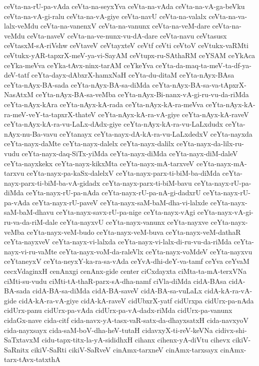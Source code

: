{ceVta-na-rU-pa-vAda
ceVta-na-seyxYva
ceVta-na-vAda
ceVta-na-vA-ga-beVku
ceVta-na-vA-gi-ralu
ceVta-na-vA-giye
ceVta-navU
ceVta-na-valalx
ceVta-na-va-lalx-veMdu
ceVta-na-vanenxV
ceVta-na-vanunx
ceVta-na-veM-dare
ceVta-na-veMdu
ceVta-naveV
ceVta-na-ve-nunx-vu-dA-dare
ceVta-navu
ceVtasusx
ceVtasxM-sA-riVshw
ceVtaveV
ceVtayxteV
ceVtf
ceVti
ceVtoV
ceVtukx-vaRMti
ceVtukx-yAR-tapxrX-meV-ya-vi-SayAM
ceVtupx-ru-SAthaRM
ceYSAM
ceYkAca
ceYka-meVva
ceYka-tAvx-ninx-tarAM
ceYkeYva
ceYta-da-maq-ta-meV-ta-df-ya-deV-tatf
ceYta-dayx-dAbxrX-hamxNaH
ceYta-du-ditaM
ceYta-nAyx-BAsa
ceYta-nAyx-BA-sada
ceYta-nAyx-BA-sa-diMda
ceYta-nAyx-BA-sa-va-tApxrX-NasAtxM
ceYta-nAyx-BA-sa-veMba
ceYta-nAyx-Bi-nanx-vA-gi-ru-vu-da-riMda
ceYta-nAyx-kAra
ceYta-nAyx-kA-rada
ceYta-nAyx-kA-ra-meVva
ceYta-nAyx-kA-ra-meV-veY-ta-tapxrX-thateV
ceYta-nAyx-kA-ra-vA-giye
ceYta-nAyx-kA-raveV
ceYta-nAyx-kA-ra-vu-LaLx-dAdx-giye
ceYta-nAyx-kA-ra-vu-LaLxdudx
ceYta-nAyx-nu-Ba-vavu
ceYtanayx
ceYta-nayx-dA-kA-ra-vu-LaLxdedxV
ceYta-nayxda
ceYta-nayx-daMte
ceYta-nayx-dalelx
ceYta-nayx-dalilx
ceYta-nayx-da-lilx-ru-vudu
ceYta-nayx-daq-SiTx-yiMda
ceYta-nayx-diMda
ceYta-nayx-diM-daleV
ceYta-nayxkekx
ceYta-nayx-kikxMta
ceYta-nayx-mA-tarxveV
ceYta-nayx-mA-tarxvu
ceYta-nayx-pa-kaSx-dalelxV
ceYta-nayx-parx-ti-biM-ba-diMda
ceYta-nayx-parx-ti-biM-ba-vA-gidadx
ceYta-nayx-parx-ti-biM-bavu
ceYta-nayx-rU-pa-diMda
ceYta-nayx-rU-pa-nAda
ceYta-nayx-rU-pa-nA-gi-dadxrU
ceYta-nayx-rU-pa-vAda
ceYta-nayx-rU-paveV
ceYta-nayx-saM-baM-dha-vi-lalxde
ceYta-nayx-saM-baM-dhavu
ceYta-nayx-savx-rU-pa-nige
ceYta-nayx-vAgi
ceYta-nayx-vA-gi-ru-va-da-riM-dale
ceYta-nayxvU
ceYta-nayx-vanunx
ceYta-nayxve
ceYta-nayx-veMba
ceYta-nayx-veM-budo
ceYta-nayx-veM-buva
ceYta-nayx-veM-dathaR
ceYta-nayxveV
ceYta-nayx-vi-lalxda
ceYta-nayx-vi-lalx-di-ru-vu-da-riMda
ceYta-nayx-vi-ru-vaMte
ceYta-nayx-voM-da-raleVlx
ceYta-nayx-voMdeV
ceYta-nayxvu
ceYtaneyxV
ceYta-neyxY-ka-ra-sa-vAda
ceYvA-dhi-deY-va-tamf
ceYva
ceYvaM
cecxVdaginxH
cenAnxgi
cenAnx-gide
center
ciCxdayxta
ciMta-ta-mA-terxVNa
ciMti-su-vudu
ciMti-tA-thaR-parx-sA-dha-namf
ciVla-diMda
cidA-BAsa
cidA-BA-sada
cidA-BA-sa-diMda
cidA-BA-saveV
cidA-BA-sa-vuLaLx
cidA-kA-ra-vA-gide
cidA-kA-ra-vA-giye
cidA-kA-raveV
cidUbxrX-yatf
cidUrxpa
cidUrx-pa-nAda
cidUrx-panu
cidUrx-pa-vAda
cidUrx-pa-vA-dadx-riMda
cidUrx-pa-vanunx
cidaGx-nave
cida-citf
cida-navx-yA-tasx-vaR-satx-da-dhayxsatxH
cida-navxyoV
cida-nayxsayx
cida-saM-boV-dha-heV-tutaH
cidavxyX-ti-reV-keVNa
cidivx-shi-SaTxtavxM
cidu-tapx-titx-la-yA-sididhxH
cihanx
cihenx-yA-diVtu
cihevx
cikiV-SaRnitx
cikiV-SaRti
cikiV-SaRveV
cinAmx-tarxneV
cinAmx-tarxsayx
cinAmx-tarx-tAvx-tatxthA
}
